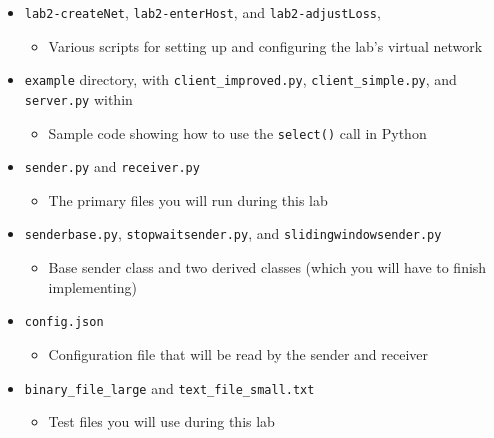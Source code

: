 \documentclass[11pt]{article}
\begin{document}
\begin{itemize}
    \item \texttt{lab2-createNet}, \texttt{lab2-enterHost}, and \texttt{lab2-adjustLoss},
        \begin{itemize}
            \item Various scripts for setting up and configuring the lab's virtual network
        \end{itemize}

    \item \texttt{example} directory, with \texttt{client\_improved.py}, \texttt{client\_simple.py}, and \texttt{server.py} within
        \begin{itemize}
            \item Sample code showing how to use the \texttt{select()} call in Python
        \end{itemize}

    \item \texttt{sender.py} and \texttt{receiver.py}
        \begin{itemize}
            \item The primary files you will run during this lab
        \end{itemize}

    \item \texttt{senderbase.py}, \texttt{stopwaitsender.py}, and \texttt{slidingwindowsender.py}
        \begin{itemize}
            \item Base sender class and two derived classes (which you will have to finish implementing)
        \end{itemize}

    \item \texttt{config.json}
        \begin{itemize}
            \item Configuration file that will be read by the sender and receiver
        \end{itemize}

    \item \texttt{binary\_file\_large} and \texttt{text\_file\_small.txt}
        \begin{itemize}
            \item Test files you will use during this lab
        \end{itemize}
\end{itemize}

\end{document}
